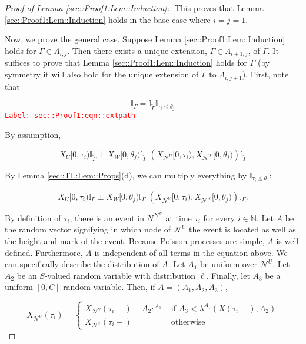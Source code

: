 \documentclass[12pt]{article}
\newcommand{\mb}{\mathbb}
\newcommand{\mc}{\mathcal}
\newcommand{\te}{\text}
\newcommand{\ep}{\epsilon}
\newcommand{\tr}{\textcolor{red}}
\newcommand{\labe}[1]{\tr{\texttt{Label: #1}}}
\newcommand{\ind}{\hspace{24pt}}
\renewcommand{\U}{U}							%
\newcommand{\UU}{W}								%
\renewcommand{\S}{S}							%
\newcommand{\ev}{\ep}							%
\newcommand{\X}{X}								%
\newcommand{\neigh}{\mc{N}}						%
\newcommand{\vind}[1]{^{#1}}					%
\newcommand{\cind}[1]{_{#1}}					%
\newcommand{\tp}[1]{(#1)}						%
\newcommand{\tip}[1]{#1}						%
\newcommand{\const}{C}							%
\newcommand{\poiss}{N}							%
\newcommand{\Sm}{\ell}							%
\newcommand{\rate}{\lambda}						%
\newcommand{\alt}[1]{\widetilde{#1}}			%
\newcommand{\indx}[1]{_{#1}}					%
\newcommand{\rt}{\tau}							%
\newcommand{\rtt}{\theta}						%
\newcommand{\apath}{\Gamma}						%
\newcommand{\pathset}[2]{\Lambda_{#1,#2}}		%
\newcommand{\rv}{A}								%
\begin{document}
\begin{proof}[Proof of Lemma \ref{sec::Proof1:Lem::Induction}:]
This proves that Lemma \ref{sec::Proof1:Lem::Induction} holds in the base case where \(i = j = 1\).

\ind Now, we prove the general case. Suppose Lemma \ref{sec::Proof1:Lem::Induction} holds for \(\alt{\apath} \in \pathset{i}{j}\). Then there exists a unique extension, \(\apath \in \pathset{i+1}{j}\), of \(\alt{\apath}\). It suffices to prove that Lemma \ref{sec::Proof1:Lem::Induction} holds for \(\apath\) (by symmetry it will also hold for the unique extension of \(\alt{\apath} \te{ to } \pathset{i}{j+1}\)). First, note that

\begin{equation}
\mb{I}_{\apath} = \mb{I}_{\alt{\apath}}\mb{I}_{\rt\indx{i} \leq \rtt\indx{j}}
\label{sec::Proof1:eqn::extpath}
\end{equation}
\labe{sec::Proof1:eqn::extpath}

By assumption,

\[\X\cind{\U}\tip{[0,\rt\indx{i})}\mb{I}_{\alt{\apath}}\perp \X\cind{\UU}\tip{[0,\rtt\indx{j})}\mb{I}_{\alt{\apath}}|\left(\X\cind{\neigh\vind{\U}}\tip{[0,\rt\indx{i})},\X\cind{\neigh\vind{\UU}}\tip{[0,\rtt\indx{j})}\right)\mb{I}_{\alt{\apath}}\]

By Lemma \ref{sec::TL:Lem::Props}(d), we can multiply everything by \(\mb{I}_{\rt\indx{i} \leq \rtt\indx{j}}\):

\[\X\cind{\U}\tip{[0,\rt\indx{i})}\mb{I}_{\apath}\perp \X\cind{\UU}\tip{[0,\rtt\indx{j})}\mb{I}_{\apath}|\left(\X\cind{\neigh\vind{\U}}\tip{[0,\rt\indx{i})},\X\cind{\neigh\vind{\UU}}\tip{[0,\rtt\indx{j})}\right)\mb{I}_{\apath}.\]

By definition of \(\rt\indx{i}\), there is an event in \(\poiss\vind{\neigh\vind{\U}}\) at time \(\rt\indx{i}\) for every \(i \in \mb{ N}\). Let \(\rv\) be the random vector signifying in which node of \(\neigh\vind{\U}\) the event is located as well as the height and mark of the event. Because Poisson processes are simple, \(\rv\) is well-defined. Furthermore, \(\rv\) is independent of all terms in the equation above. We can specifically describe the distribution of \(\rv\). Let \(\rv\cind{1}\) be uniform over \(\neigh\vind{\U}\). Let \(\rv\cind{2}\) be an \(\S\)-valued random variable with distribution \(\Sm\). Finally, let \(\rv\cind{3}\) be a uniform \([0,\const]\) random variable. Then, if \(\rv=(\rv\cind{1},\rv\cind{2},\rv\cind{3})\),

\[\X\cind{\neigh\vind{\U}}\tp{\rt\indx{i}} = \begin{cases}
\X\cind{\neigh\vind{\U}}\tp{\rt\indx{i}-} + \rv\cind{2}\ev\vind{\rv\cind{1}} &\te{ if } \rv\cind{3}< \rate\vind{\rv\cind{1}}(\X\tp{\rt\indx{i}-}, \rv\cind{2})\\
\X\cind{\neigh\vind{\U}}\tp{\rt\indx{i}-} &\te{ otherwise}
\end{cases}\]


\end{proof}
\end{document}
